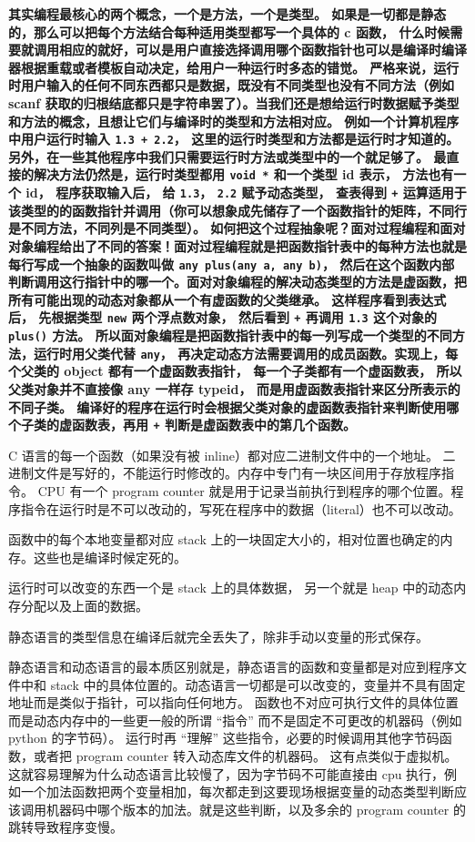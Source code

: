 \textbf{其实编程最核心的两个概念，一个是\textbf{方法}，一个是\textbf{类型}。 如果是一切都是静态的，那么可以把每个方法结合每种适用类型都写一个具体的 c 函数， 什么时候需要就调用相应的就好，可以是用户直接选择调用哪个函数指针也可以是编译时编译器根据重载或者模板自动决定，给用户一种运行时多态的错觉。 严格来说，运行时用户输入的任何不同东西都只是数据，既没有不同类型也没有不同方法（例如 scanf 获取的归根结底都只是字符串罢了）。当我们还是想给运行时数据赋予类型和方法的概念，且想让它们与编译时的类型和方法相对应。 例如一个计算机程序中用户运行时输入 \verb`1.3 + 2.2`， 这里的运行时类型和方法都是运行时才知道的。 另外，在一些其他程序中我们只需要运行时方法或类型中的一个就足够了。 最直接的解决方法仍然是，运行时类型都用 \verb`void *` 和一个类型 id 表示， 方法也有一个 id， 程序获取输入后， 给 \verb`1.3`， \verb`2.2` 赋予动态类型， 查表得到 \verb`+` 运算适用于该类型的的函数指针并调用（你可以想象成先储存了一个函数指针的矩阵，不同行是不同方法，不同列是不同类型）。 如何把这个过程抽象呢？面对过程编程和面对对象编程给出了不同的答案！面对过程编程就是把函数指针表中的每种方法也就是每行写成一个抽象的函数叫做 \verb`any plus(any a, any b)`， 然后在这个函数内部判断调用这行指针中的哪一个。面对对象编程的解决动态类型的方法是虚函数，把所有可能出现的动态对象都从一个有虚函数的父类继承。 这样程序看到表达式后， 先根据类型 \verb`new` 两个浮点数对象， 然后看到 \verb`+` 再调用 \verb`1.3` 这个对象的 \verb`plus()` 方法。 所以面对象编程是把函数指针表中的每一列写成一个类型的不同方法，运行时用父类代替 \verb`any`， 再决定动态方法需要调用的成员函数。实现上，每个父类的 object 都有一个虚函数表指针， 每一个子类都有一个虚函数表， 所以父类对象并不直接像 any 一样存 typeid， 而是用虚函数表指针来区分所表示的不同子类。 编译好的程序在运行时会根据父类对象的虚函数表指针来判断使用哪个子类的虚函数表，再用 \verb`+` 判断是虚函数表中的第几个函数。}

C 语言的每一个函数（如果没有被 inline）都对应二进制文件中的一个地址。 二进制文件是写好的，不能运行时修改的。内存中专门有一块区间用于存放程序指令。 CPU 有一个 program counter 就是用于记录当前执行到程序的哪个位置。程序指令在运行时是不可以改动的，写死在程序中的数据（literal）也不可以改动。

函数中的每个本地变量都对应 stack 上的一块固定大小的，相对位置也确定的内存。这些也是编译时候定死的。

运行时可以改变的东西一个是 stack 上的具体数据， 另一个就是 heap 中的动态内存分配以及上面的数据。

静态语言的类型信息在编译后就完全丢失了，除非手动以变量的形式保存。

静态语言和动态语言的最本质区别就是，静态语言的函数和变量都是对应到程序文件中和 stack 中的具体位置的。动态语言一切都是可以改变的，变量并不具有固定地址而是类似于指针，可以指向任何地方。 函数也不对应可执行文件的具体位置而是动态内存中的一些更一般的所谓 “指令” 而不是固定不可更改的机器码（例如 python 的字节码）。 运行时再 “理解” 这些指令，必要的时候调用其他字节码函数，或者把 program counter 转入动态库文件的机器码。 这有点类似于虚拟机。 这就容易理解为什么动态语言比较慢了，因为字节码不可能直接由 cpu 执行，例如一个加法函数把两个变量相加，每次都走到这要现场根据变量的动态类型判断应该调用机器码中哪个版本的加法。就是这些判断，以及多余的 program counter 的跳转导致程序变慢。


